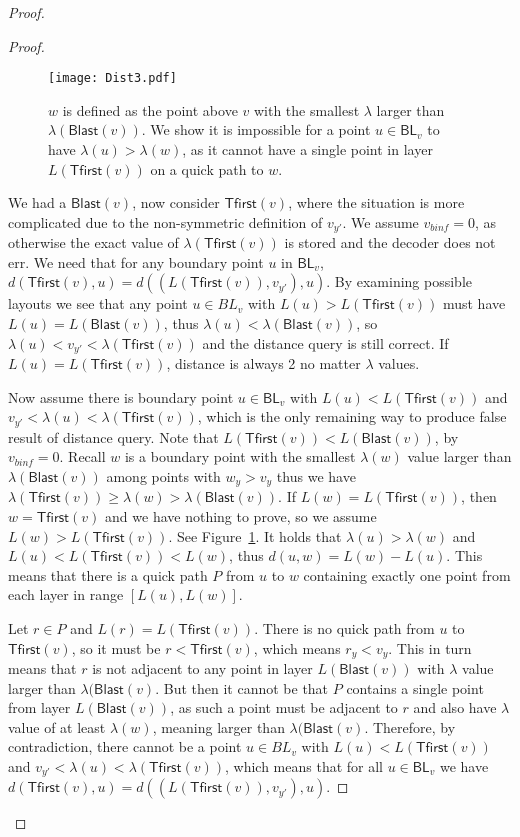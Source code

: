 \documentclass[a4paper,11pt]{article}
\newcommand{\lam}{\lambda}
\newcommand{\BL}{\mathsf{BL}}
\newcommand{\Blast}{\mathsf{Blast}}
\newcommand{\Tfirst}{\mathsf{Tfirst}}
\begin{document}
\begin{proof}
\begin{proof}
\begin{figure}[h]
\begin{center}
  \texttt{[image: Dist3.pdf]}
\end{center}
\caption{$w$ is defined as the point above $v$ with the smallest $\lam$ larger than $\lam(\Blast(v))$.
We show it is impossible for a point $u \in \BL_v$ to have $\lam(u)>\lam(w)$, as it cannot have a single point in layer
$L(\Tfirst(v))$ on a quick path to $w$.}
\label{Fig:Dist3}
\end{figure}

We had a $\Blast(v)$, now consider $\Tfirst(v)$, where the situation is more complicated due to the non-symmetric definition of $v_{y'}$.
We assume $v_{binf}=0$, as otherwise the exact value of $\lam(\Tfirst(v))$ is stored and the decoder does not err.
We need that for any boundary point $u$ in $\BL_v$, $d(\Tfirst(v),u)=d((L(\Tfirst(v)),v_{y'}), u)$.
By examining possible layouts we see that any point $u \in BL_{v}$ with $L(u)>L(\Tfirst(v))$ must have
$L(u)=L(\Blast(v))$, thus $\lam(u)<\lam(\Blast(v))$, so $\lam(u)<v_{y'}<\lam(\Tfirst(v))$ and the distance query is still correct.
If $L(u)=L(\Tfirst(v))$, distance is always 2 no matter $\lam$ values.

Now assume there is boundary point $u \in \BL_{v}$ with $L(u)<L(\Tfirst(v))$ and $v_{y'}<\lam(u)<\lam(\Tfirst(v))$,
which is the only remaining way to produce false result of distance query.
Note that $L(\Tfirst(v))<L(\Blast(v))$, by $v_{binf}=0$.
Recall $w$ is a boundary point with the smallest $\lam(w)$ value larger than $\lam(\Blast(v))$ among points with $w_y>v_y$
thus we have $\lam(\Tfirst(v)) \geq \lam(w) > \lam(\Blast(v))$.
If $L(w)=L(\Tfirst(v))$, then $w=\Tfirst(v)$ and we have nothing to prove, so we assume $L(w)>L(\Tfirst(v))$.
See Figure~\ref{Fig:Dist3}.
It holds that $\lam(u)>\lam(w)$ and $L(u) < L(\Tfirst(v)) < L(w)$, thus $d(u,w)=L(w)-L(u)$.
This means that there is a quick path $P$ from $u$ to $w$ containing exactly one point from each layer in range $[L(u),L(w)]$.

Let $r \in P$ and $L(r)=L(\Tfirst(v))$.
There is no quick path from $u$ to $\Tfirst(v)$, so it must be $r<\Tfirst(v)$, which means $r_y < v_y$.
This in turn means that $r$ is not adjacent to any point in layer $L(\Blast(v))$
with $\lam$ value larger than $\lam(\Blast(v)$.
But then it cannot be that $P$ contains a single point from layer $L(\Blast(v))$, as such a point must be adjacent to
$r$ and also have $\lam$ value of at least $\lam(w)$, meaning larger than $\lam(\Blast(v)$.
Therefore, by contradiction, there cannot be a point $u \in BL_{v}$ with $L(u)<L(\Tfirst(v))$
and $v_{y'}<\lam(u)<\lam(\Tfirst(v))$, which means that for all $u \in \BL_v$
we have $d(\Tfirst(v),u)=d((L(\Tfirst(v)),v_{y'}), u)$.


\end{proof}
\end{proof}
\end{document}
